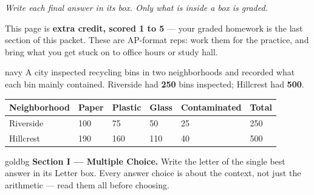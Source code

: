\documentclass[12pt]{article}
\begin{document}
{\small\itshape Write each final answer in its box. Only what is inside a box is graded.}\par

\vspace{0.15in}

\boxguard[8]
\begin{remindbox}
\small
This page is \textbf{extra credit, scored 1 to 5} --- your graded homework is the last section
of this packet. These are AP-format reps: work them for the practice, and bring what you get
stuck on to office hours or study hall.
\end{remindbox}

\vspace{0.12in}

\boxguard[26]
\begin{scenariobox}{navy}
\small
A city inspected recycling bins in two neighborhoods and recorded what each bin mainly
contained. Riverside had \textbf{250} bins inspected; Hillcrest had \textbf{500}.

\vspace{8pt}
\renewcommand{\arraystretch}{1.25}
\begin{tabularx}{\linewidth}{@{} l Y Y Y Y Y @{}}
\textbf{Neighborhood} & \textbf{Paper} & \textbf{Plastic} & \textbf{Glass} &
\textbf{Contaminated} & \textbf{Total} \\
\hline
Riverside & 100 &  75 &  50 & 25 & 250 \\
Hillcrest & 190 & 160 & 110 & 40 & 500 \\
\hline
\end{tabularx}
\end{scenariobox}

\vspace{0.14in}

\boxguard[16]
\begin{headlinebox}{goldbg}
\small
\textbf{Section I --- Multiple Choice.} Write the letter of the single best answer in its Letter box. Every answer choice is
about the context, not just the arithmetic --- read them all before choosing.
\end{headlinebox}

\vspace{0.10in}
\end{document}
